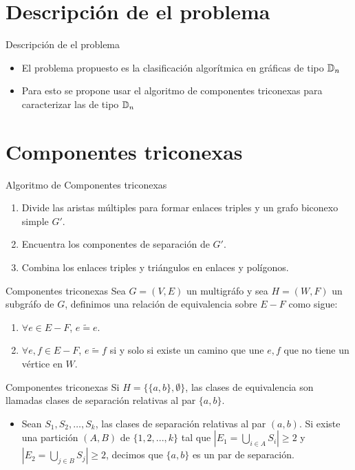 \documentclass[spanish]{beamer}
\begin{document}
\section{Descripción de el problema}
\begin{frame}{Descripción de el problema}
  \begin{itemize}
     \item El problema propuesto es la clasificación algorítmica en gráficas de tipo $\mathbb{D}_{n}$
     \item Para esto se propone usar el algoritmo de componentes triconexas para caracterizar las de tipo $\mathbb{D}_{n}$
    \end{itemize}	
\end{frame}

\section{Componentes triconexas}
\begin{frame}{Algoritmo de Componentes triconexas}
  \begin{enumerate}
  	\item Divide las aristas múltiples para formar enlaces triples y un grafo biconexo simple $G'$.
    \item Encuentra los componentes de separación de $G'$.
    \item Combina los enlaces triples y triángulos en enlaces y polígonos.
  \end{enumerate}
\end{frame}

\begin{frame}{Componentes triconexas}
Sea $G = (V, E)$ un multigráfo y sea $H = (W, F)$ un subgráfo de $G$, definimos una relación de equivalencia sobre $E - F$ como sigue:
  \begin{definitions}
    \begin{enumerate}
    \item $\forall e \in E - F$, $e \widetilde{=} e$.
    \item $\forall e, f \in E - F$, $e \widetilde{=} f$ si y solo si existe un camino que une $e, f$ que no tiene un vértice en $W$.
    \end{enumerate}
  \end{definitions}
\end{frame}

\begin{frame}{Componentes triconexas}
Si $H = \{\{a, b\}, \emptyset\}$, las clases de equivalencia son llamadas clases de separación relativas al par $\{a, b\}$.
  \begin{definitions}
    \begin{itemize}
      \item Sean $S_1,S_2,\ldots, S_k$, las clases de separación relativas al par $(a,b)$. Si existe una partición $(A,B)$ de $\{1,2, . . . , k\}$ tal que $|E_{1} = \bigcup_{i \in A} S_i| \geq 2$ y $ |E_{2}= \bigcup_{j \in B} S_j| \geq 2$, decimos que $\{a,b\}$ es un par de separación.
    \end{itemize}
  \end{definitions}
\end{frame}
\end{document}
